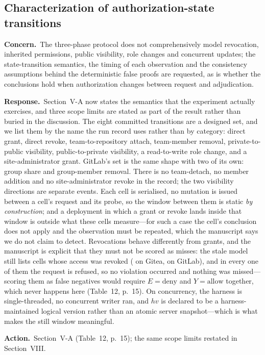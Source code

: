 \documentclass[10pt,letterpaper]{article}
\newcommand{\Concern}[1]{\par\smallskip\noindent\textbf{Concern.}\ #1\par}
\newcommand{\Response}[1]{\par\smallskip\noindent\textbf{Response.}\ #1\par}
\newcommand{\Action}[1]{\par\smallskip\noindent\textbf{Action.}\ #1\par}
\begin{document}
\subsection{Characterization of authorization-state transitions}
\Concern{The three-phase protocol does not comprehensively model revocation,
inherited permissions, public visibility, role changes and concurrent updates;
the state-transition semantics, the timing of each observation and the
consistency assumptions behind the deterministic false proofs are requested, as
is whether the conclusions hold when authorization changes between request and
adjudication.}
\Response{Section~V-A now states the semantics that the experiment actually
exercises, and three scope limits are stated as part of the result rather than
buried in the discussion. The eight committed transitions are a designed set,
and we list them by the name the run record uses rather than by category:
direct grant, direct revoke, team-to-repository attach, team-member removal,
private-to-public visibility, public-to-private visibility, a read-to-write role
change, and a site-administrator grant. GitLab's set is the same shape with two
of its own: group share and group-member removal. There is no team-detach, no
member addition and no site-administrator revoke in the record; the two
visibility directions are separate events. Each cell is
serialised, no mutation is issued between a cell's request and its probe, so the
window between them is static \emph{by construction}; and a deployment in which a
grant or revoke lands inside that window is outside what these cells measure---for
such a case the cell's conclusion does not apply and the observation must be
repeated, which the manuscript says we do not claim to detect. Revocations behave
differently from grants, and the manuscript is explicit that they must not be
scored as misses: the stale model still lists \TmpBothOverRevoke{} cells whose
access was revoked (\TmpOverRevoke{} on Gitea, \TmpGOverRevoke{} on GitLab), and
in every one of them the request is refused, so no violation occurred and
nothing was missed---scoring them as false negatives would require
$E=\text{deny}$ and $Y=\text{allow}$ together, which never happens here
(Table~12, p.~15). On concurrency, the harness is single-threaded, no concurrent
writer ran, and $hv$ is declared to be a harness-maintained logical version
rather than an atomic server snapshot---which is what makes the still window
meaningful.}
\Action{Section~V-A (Table~12, p.~15); the same scope limits restated in
Section~VIII.}
\end{document}
